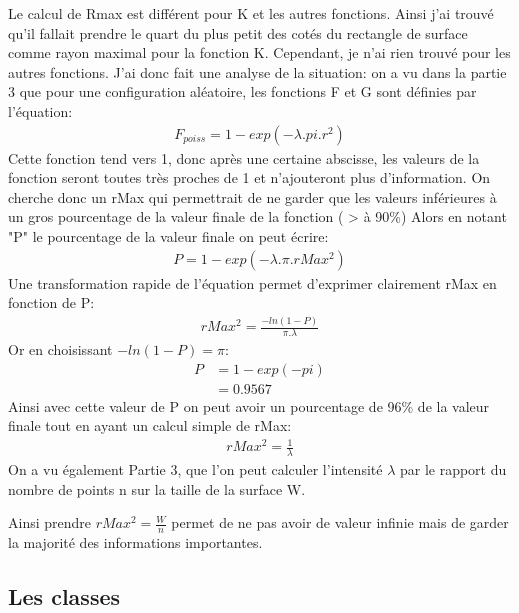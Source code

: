 \documentclass[stage2a]{tnreport}
\begin{document}
Le calcul de Rmax est différent pour K et les autres fonctions. Ainsi j'ai trouvé qu'il fallait prendre le quart du plus petit des cotés du rectangle de surface comme rayon maximal pour la fonction K. Cependant, je n'ai rien trouvé pour les autres fonctions.
J'ai donc fait une analyse de la situation: on a vu dans la partie 3 que pour une configuration aléatoire, les fonctions F et G sont définies par l'équation:
\begin{align*}
F_{poiss} = 1-exp(-\lambda.pi.r^2)
\end{align*}
Cette fonction tend vers 1, donc après une certaine abscisse, les valeurs de la fonction seront toutes très proches de 1 et n'ajouteront plus d'information.
On cherche donc un rMax qui permettrait de ne garder que les valeurs inférieures à un gros pourcentage de la valeur finale de la fonction ( > à 90\%)
Alors en notant "P" le pourcentage de la valeur finale on peut écrire:
\begin{align*}
P = 1-exp(-\lambda.\pi.rMax^2)
\end{align*}
Une transformation rapide de l'équation permet d'exprimer clairement rMax en fonction de P:
\begin{align*}
rMax^2 = \frac{-ln(1-P)}{\pi.\lambda}
\end{align*}
Or en choisissant \begin{math}-ln(1-P)=\pi\end{math}:
\begin{align*}
P &= 1-exp(-pi)\\
&=0.9567
\end{align*}
Ainsi avec cette valeur de P on peut avoir un pourcentage de 96\% de la valeur finale tout en ayant un calcul simple de rMax:
\begin{align*}
rMax^2 = \frac{1}{\lambda}
\end{align*}
On a vu également Partie 3, que l'on peut calculer l'intensité \begin{math}\lambda\end{math} par le rapport du nombre de points n sur la taille de la surface W.

Ainsi prendre \begin{math} rMax^2 = \frac{W}{n} \end{math} permet de ne pas avoir de valeur infinie mais de garder la majorité des informations importantes. 


\subsection{Les classes}
\end{document}
